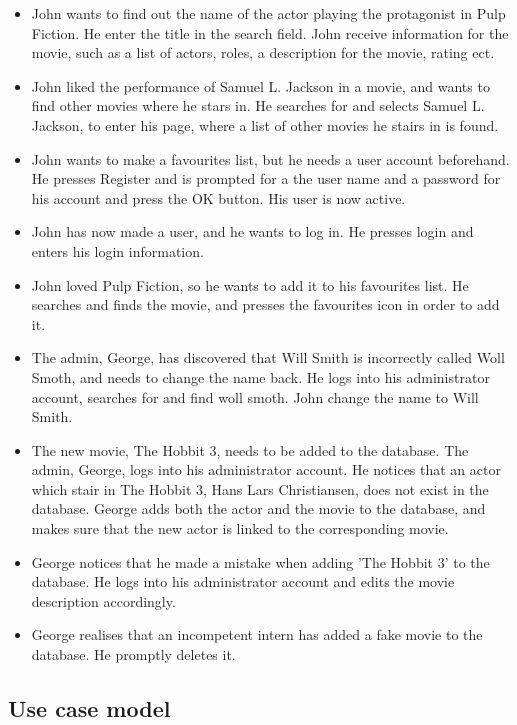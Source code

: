 \begin{itemize}
	\setlength{\itemsep}{-5pt}
	
	\item John wants to find out the name of the actor playing the protagonist in Pulp Fiction. He enter the title in the search field. John receive information for the movie, such as a list of actors, roles, a description for the movie, rating ect.
	\item John liked the performance of Samuel L. Jackson in a movie, and wants to find other movies where he stars in. He searches for and selects Samuel L. Jackson, to enter his page, where a list of other movies he stairs in is found.
	\item John wants to make a favourites list, but he needs a user account beforehand. He presses Register and is prompted for a the user name and a password for his account and press the OK button. His user is now active.
	\item John has now made a user, and he wants to log in. He presses login and enters his login information.
	\item John loved Pulp Fiction, so he wants to add it to his favourites list. He searches and finds the movie, and presses the favourites icon in order to add it.
	
	\item The admin, George, has discovered that Will Smith is incorrectly called Woll Smoth, and needs to change the name back. He logs into his administrator account, searches for and find woll smoth. John change the name to Will Smith.
	\item The new movie, The Hobbit 3, needs to be added to the database. The admin, George, logs into his administrator account. He notices that an actor which stair in The Hobbit 3, Hans Lars Christiansen, does not exist in the database. George adds both the actor and the movie to the database, and makes sure that the new actor is linked to the corresponding movie.
	\item George notices that he made a mistake when adding 'The Hobbit 3' to the database. He logs into his administrator account and edits the movie description accordingly.
	\item George realises that an incompetent intern has added a fake movie to the database. He promptly deletes it.
\end{itemize}

\subsection{Use case model}




